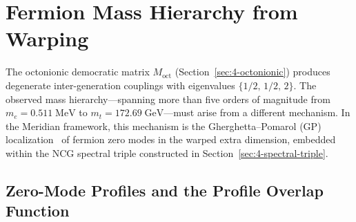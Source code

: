 
\section{Fermion Mass Hierarchy from Warping}
\label{sec:4-fermion-mass}

The octonionic democratic matrix $M_{\mathrm{oct}}$ (Section~\ref{sec:4-octonionic}) produces degenerate inter-generation couplings with eigenvalues $\{1/2,\, 1/2,\, 2\}$. The observed mass hierarchy---spanning more than five orders of magnitude from $m_e = 0.511\;\mathrm{MeV}$ to $m_t = 172.69\;\mathrm{GeV}$---must arise from a different mechanism. In the Meridian framework, this mechanism is the Gherghetta--Pomarol (GP) localization~\cite{ch4:GherghettaPomarol2000} of fermion zero modes in the warped extra dimension, embedded within the NCG spectral triple constructed in Section~\ref{sec:4-spectral-triple}.

\subsection{Zero-Mode Profiles and the Profile Overlap Function}
\label{sec:4-zero-mode-profiles}

